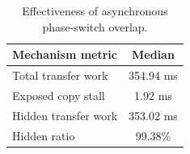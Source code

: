 \begin{table}[t]
\centering
\small
\caption{Effectiveness of asynchronous phase-switch overlap.}
\begin{tabular}{lc}
\toprule
Mechanism metric & Median \\
\midrule
Total transfer work & 354.94 ms \\
Exposed copy stall & 1.92 ms \\
Hidden transfer work & 353.02 ms \\
Hidden ratio & 99.38\% \\
\bottomrule
\end{tabular}
\label{tab:overlap-profile}
\end{table}
